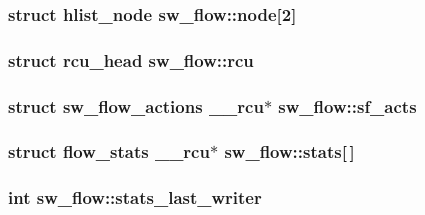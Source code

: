 \subsubsection[{node}]{\setlength{\rightskip}{0pt plus 5cm}struct hlist\+\_\+node sw\+\_\+flow\+::node\mbox{[}2\mbox{]}}\label{structsw__flow_ad56483ca56d2f95857eee360e934fcf2}
\hypertarget{structsw__flow_ac58ef2fab6f9d88be75d73e4d2a1e002}{}
\subsubsection[{rcu}]{\setlength{\rightskip}{0pt plus 5cm}struct rcu\+\_\+head sw\+\_\+flow\+::rcu}\label{structsw__flow_ac58ef2fab6f9d88be75d73e4d2a1e002}
\hypertarget{structsw__flow_aa845bdaabc25d81dcf8b1a7519b35408}{}
\subsubsection[{sf\+\_\+acts}]{\setlength{\rightskip}{0pt plus 5cm}struct {\bf sw\+\_\+flow\+\_\+actions} {\bf \+\_\+\+\_\+rcu}$\ast$ sw\+\_\+flow\+::sf\+\_\+acts}\label{structsw__flow_aa845bdaabc25d81dcf8b1a7519b35408}
\hypertarget{structsw__flow_a5ccc743bcf16038ab0cf5dda88565f33}{}
\subsubsection[{stats}]{\setlength{\rightskip}{0pt plus 5cm}struct {\bf flow\+\_\+stats} {\bf \+\_\+\+\_\+rcu}$\ast$ sw\+\_\+flow\+::stats\mbox{[}$\,$\mbox{]}}\label{structsw__flow_a5ccc743bcf16038ab0cf5dda88565f33}
\hypertarget{structsw__flow_a7b4a10d23b2824b421527bc2600ef4ba}{}
\subsubsection[{stats\+\_\+last\+\_\+writer}]{\setlength{\rightskip}{0pt plus 5cm}int sw\+\_\+flow\+::stats\+\_\+last\+\_\+writer}\label{structsw__flow_a7b4a10d23b2824b421527bc2600ef4ba}
\hypertarget{structsw__flow_af5dad10ae036092f5a26cfebb050a03a}{}
